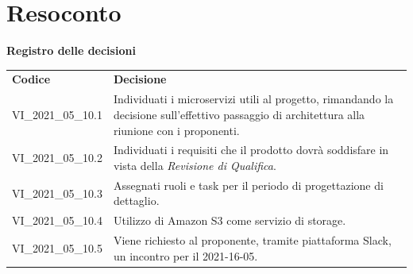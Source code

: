 \documentclass[a4paper]{article}
\begin{document}
\section{Resoconto}
\begin{center}
    \textbf{\Large Registro delle decisioni}\\
    \vspace{10px}
    \begin{table}[h!]
        \centering
        \renewcommand{\arraystretch}{1.8}
        \begin{tabular}{p{200px} p{200px}}
            \rowcolor{logo!70} \textbf{Codice} & \textbf{Decisione}                                                                                                                             \\
            VI\_2021\_05\_10.1                 & Individuati i microservizi utili al progetto, rimandando la decisione sull'effettivo passaggio di architettura alla riunione con i proponenti. \\
            VI\_2021\_05\_10.2                 & Individuati i requisiti che il prodotto dovrà soddisfare in vista della \textit{Revisione di Qualifica}.                                       \\
            VI\_2021\_05\_10.3                 & Assegnati ruoli e task per il periodo di progettazione di dettaglio.                                                                           \\
            VI\_2021\_05\_10.4                 & Utilizzo di Amazon S3 come servizio di storage.                                                                                                \\
            VI\_2021\_05\_10.5                 & Viene richiesto al proponente, tramite piattaforma Slack, un incontro per il 2021-16-05.                                                       \\
        \end{tabular}
    \end{table}
\end{center}
\end{document}

